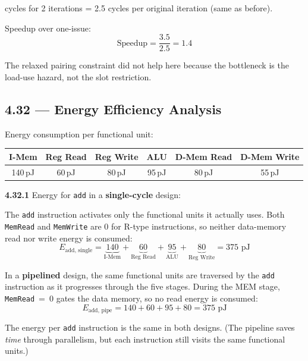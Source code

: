  cycles for 2 iterations = 2.5 cycles per original iteration
(same as before).

Speedup over one-issue:
\[
\text{Speedup} = \frac{3.5}{2.5} = 1.4
\]

\noindent The relaxed pairing constraint did not help here because the
bottleneck is the load-use hazard, not the slot restriction.

\subsection*{4.32 --- Energy Efficiency Analysis}
\hypertarget{sol-4.32}{}

Energy consumption per functional unit:

\begin{center}
\begin{tabular}{cccccc}
\toprule
\textbf{I-Mem} & \textbf{Reg Read} & \textbf{Reg Write} & \textbf{ALU} &
\textbf{D-Mem Read} & \textbf{D-Mem Write} \\
\midrule
140\,pJ & 60\,pJ & 80\,pJ & 95\,pJ & 80\,pJ & 55\,pJ \\
\bottomrule
\end{tabular}
\end{center}

\medskip\noindent\textbf{4.32.1}
Energy for \texttt{add} in a \textbf{single-cycle} design:

The \texttt{add} instruction activates only the functional units it actually
uses.  Both \texttt{MemRead} and \texttt{MemWrite} are 0 for R-type
instructions, so neither data-memory read nor write energy is consumed:
\[
E_{\text{add, single}} = \underbrace{140}_{\text{I-Mem}}
  + \underbrace{60}_{\text{Reg Read}}
  + \underbrace{95}_{\text{ALU}}
  + \underbrace{80}_{\text{Reg Write}}
  = 375 \text{ pJ}
\]

In a \textbf{pipelined} design, the same functional units are traversed by the
\texttt{add} instruction as it progresses through the five stages.  During the
MEM stage, \texttt{MemRead}~=~0 gates the data memory, so no read energy is
consumed:
\[
E_{\text{add, pipe}} = 140 + 60 + 95 + 80 = 375 \text{ pJ}
\]

\noindent The energy per \texttt{add} instruction is the same in both designs.
(The pipeline saves \emph{time} through parallelism, but each instruction
still visits the same functional units.)


